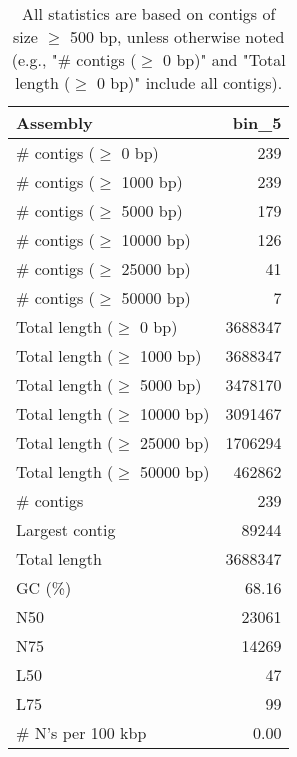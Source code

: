 \documentclass[12pt,a4paper]{article}
\begin{document}
\begin{table}[ht]
\begin{center}
\caption{All statistics are based on contigs of size $\geq$ 500 bp, unless otherwise noted (e.g., "\# contigs ($\geq$ 0 bp)" and "Total length ($\geq$ 0 bp)" include all contigs).}
\begin{tabular}{|l*{1}{|r}|}
\hline
Assembly & bin\_5 \\ \hline
\# contigs ($\geq$ 0 bp) & 239 \\ \hline
\# contigs ($\geq$ 1000 bp) & 239 \\ \hline
\# contigs ($\geq$ 5000 bp) & 179 \\ \hline
\# contigs ($\geq$ 10000 bp) & 126 \\ \hline
\# contigs ($\geq$ 25000 bp) & 41 \\ \hline
\# contigs ($\geq$ 50000 bp) & 7 \\ \hline
Total length ($\geq$ 0 bp) & 3688347 \\ \hline
Total length ($\geq$ 1000 bp) & 3688347 \\ \hline
Total length ($\geq$ 5000 bp) & 3478170 \\ \hline
Total length ($\geq$ 10000 bp) & 3091467 \\ \hline
Total length ($\geq$ 25000 bp) & 1706294 \\ \hline
Total length ($\geq$ 50000 bp) & 462862 \\ \hline
\# contigs & 239 \\ \hline
Largest contig & 89244 \\ \hline
Total length & 3688347 \\ \hline
GC (\%) & 68.16 \\ \hline
N50 & 23061 \\ \hline
N75 & 14269 \\ \hline
L50 & 47 \\ \hline
L75 & 99 \\ \hline
\# N's per 100 kbp & 0.00 \\ \hline
\end{tabular}
\end{center}
\end{table}
\end{document}
